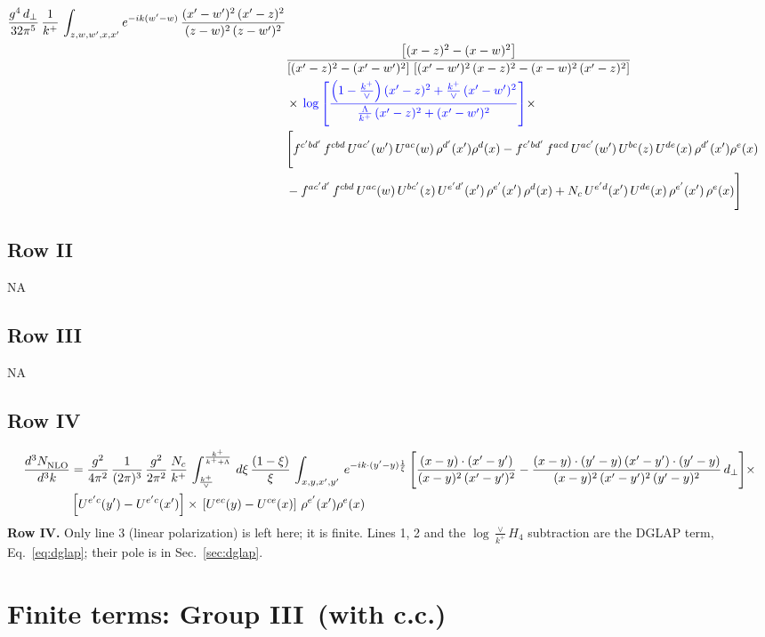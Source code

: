 \documentclass[9pt]{article}
\newcommand{\new}[1]{{\color{blue}#1}}
\numberwithin{equation}{section}
\begin{document}
\begin{align}
\frac{g^{4}\,d_{\perp}}{32\pi^{5}}\,\frac{1}{k^{+}}\,\int_{z,w,w^{\prime},x,x'} e^{-ik(w^{\prime}-w)}\,\frac{(x'-w')^{2}\, (x'-z)^{2}}{(z-w)^{2}\, (z-w')^{2}}\notag \\ & \frac{\left[(x-z)^{2} - (x-w)^{2}\right]}{\left[(x'-z)^{2} - (x'-w')^{2}\right]\, \left[(x'-w')^{2}\, (x - z)^{2} - (x-w)^{2}\,(x'-z)^{2}\right]}\notag \\ & \times\, \new{\log{\left[\frac{\left(1-\frac{k^{+}}{\vee}\right)(x'-z)^{2}+\frac{k^{+}}{\vee}\,(x'-w')^{2}}{\frac{\Lambda}{k^{+}}\,(x'-z)^{2}+(x'-w')^{2}}\right]}}\times \notag \\ &  \Bigg[f^{c'bd'}\,f^{cbd}\, U^{ac'}(w')\,U^{ac}(w)\,\rho^{d'}(x')\rho^{d}(x)- f^{c'bd'}\,f^{acd}\,U^{ac'}(w')\,U^{bc}(z)\,U^{de}(x)\,\rho^{d'}(x')\rho^{e}(x) \notag \\ & -f^{ac'd'}\,f^{cbd}\,U^{ac}(w)\,U^{bc'}(z)\,U^{e'd'}(x')\,\rho^{e'}(x')\,\rho^{d}(x) +N_{c}\,U^{e'd}(x')\,U^{de}(x)\,\rho^{e'}(x')\,\rho^{e}(x)\Bigg]
\end{align}
\subsection{Row II}
\textsc{NA}
\subsection{Row III}
\textsc{NA}
\subsection{Row IV}
\begin{align}
\frac{d^{3}N_{\rm NLO}^{\rm}}{d^{3}k}  & = \frac{g^{2}}{4\pi^{2}}\, \frac{1}{(2\pi)^{3}}\,\frac{g^{2}}{2\pi^{2}}\, \frac{N_{c}}{k^{+}}\,\int_{\frac{k^{+}}{\vee}}^{\frac{k^{+}}{k^{+}+\Lambda}}\,d\xi\, \frac{(1-\xi)}{\xi}\, \int_{x,y,x',y'}\,e^{-ik\cdot (y'-y)\frac{1}{\xi}}\,\Bigg[\frac{(x-y)\cdot (x'-y')}{(x-y)^{2}\, (x'-y')^{2}} -\frac{(x-y)\cdot (y'-y)\, (x'-y')\cdot (y'-y)}{(x-y)^{2}\,(x'-y')^{2}\,(y'-y)^{2}}\,d_{\perp}\Bigg]\times\notag \\ &  \left[U^{e'c}(y') - U^{e'c}(x')\right] \times\, \left[U^{ec}(y) - U^{ce}(x)\right]\, \rho^{e'}(x') \rho^{e}(x)
\end{align}
\new{\textbf{Row IV.} Only line 3 (linear polarization) is left here; it is finite. Lines 1, 2 and the $\log\frac{\vee}{k^+}H_4$ subtraction are the DGLAP term, Eq.~\eqref{eq:dglap}; their pole is in Sec.~\ref{sec:dglap}.}


\section{Finite terms: Group III\, (with c.c.)}
\end{document}
